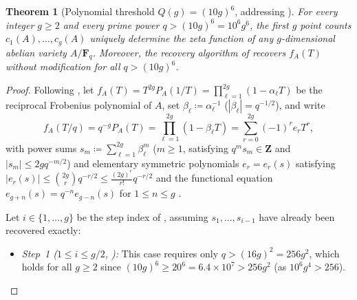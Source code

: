 \documentclass[11pt]{amsart}
\newtheorem{theorem}{Theorem}[section]
\theoremstyle{remark}
\newcommand{\F}{\mathbf{F}}
\newcommand{\Z}{\mathbf{Z}}
\begin{document}
\begin{theorem}[Polynomial threshold $Q(g) = (10g)^6$, addressing {\cite[Remark~7.12]{CK26}}]\label{thm:poly-Qg}
For every integer $g \ge 2$ and every prime power $q > (10g)^6 = 10^6 g^6$, the first $g$ point counts $c_1(A), \dots, c_g(A)$ uniquely determine the zeta function of any $g$-dimensional abelian variety $A / \F_q$. Moreover, the recovery algorithm of \cite[Sections~4--6]{CK26} recovers $f_A(T)$ without modification for all $q > (10g)^6$.
\end{theorem}

\begin{proof}
Following \cite[Section~2]{CK26}, let $f_A(T) = T^{2g} P_A(1/T) = \prod_{\ell=1}^{2g} (1 - \alpha_\ell T)$ be the reciprocal Frobenius polynomial of $A$, set $\beta_\ell \coloneqq \alpha_\ell^{-1}$ ($|\beta_\ell| = q^{-1/2}$), and write
\[
f_A(T/q) = q^{-g} P_A(T) = \prod_{\ell=1}^{2g} (1 - \beta_\ell T) = \sum_{r=0}^{2g} (-1)^r e_r T^r,
\]
with power sums $s_m \coloneqq \sum_{\ell=1}^{2g} \beta_\ell^m$ ($m \ge 1$, satisfying $q^m s_m \in \Z$ and $|s_m| \le 2g q^{-m/2}$) and elementary symmetric polynomials $e_r = e_r(s)$ satisfying $|e_r(s)| \le \binom{2g}{r} q^{-r/2} \le \frac{(2g)^r}{r!} q^{-r/2}$ and the functional equation $e_{g+n}(s) = q^{-n} e_{g-n}(s)$ for $1 \le n \le g$ \cite[Lemma~2.2]{CK26}.

Let $i \in \{1, \dots, g\}$ be the step index of \cite[Sections~4--6]{CK26}, assuming $s_1, \dots, s_{i-1}$ have already been recovered exactly:
\begin{itemize}
\item \emph{Step~1 ($1 \le i \le g/2$, \cite[Lemma~4.1]{CK26}):} This case requires only $q > (16g)^2 = 256 g^2$, which holds for all $g \ge 2$ since $(10g)^6 \ge 20^6 = 6.4 \times 10^7 > 256 g^2$ (as $10^6 g^4 > 256$).
\end{itemize}


\end{proof}
\end{document}
